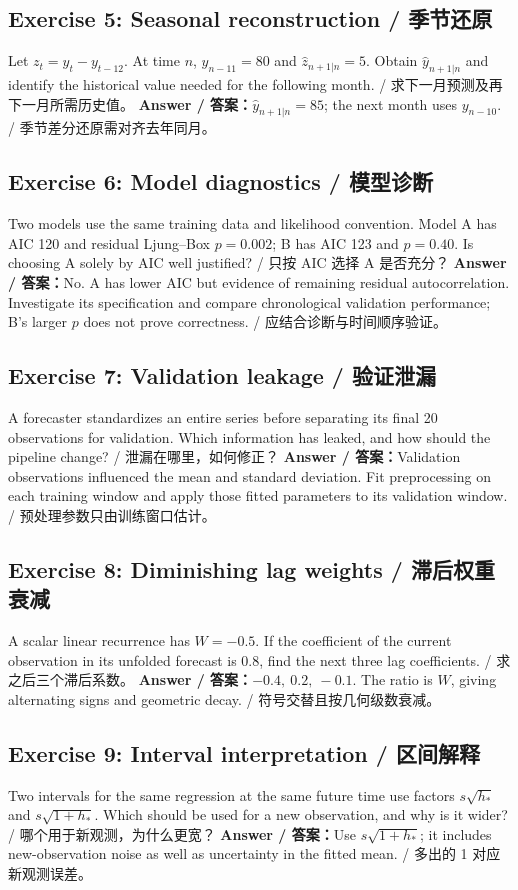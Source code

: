\documentclass[UTF8,fontset=fandol,10.5pt,a4paper]{ctexart}
\begin{document}
\subsection*{Exercise 5: Seasonal reconstruction / 季节还原}
Let $z_t=y_t-y_{t-12}$. At time $n$, $y_{n-11}=80$ and $\hat z_{n+1|n}=5$. Obtain $\hat y_{n+1|n}$ and identify the historical value needed for the following month. / 求下一月预测及再下一月所需历史值。
\textbf{Answer / 答案：}$\hat y_{n+1|n}=85$; the next month uses $y_{n-10}$. / 季节差分还原需对齐去年同月。
\subsection*{Exercise 6: Model diagnostics / 模型诊断}
Two models use the same training data and likelihood convention. Model A has AIC 120 and residual Ljung--Box $p=0.002$; B has AIC 123 and $p=0.40$. Is choosing A solely by AIC well justified? / 只按 AIC 选择 A 是否充分？
\textbf{Answer / 答案：}No. A has lower AIC but evidence of remaining residual autocorrelation. Investigate its specification and compare chronological validation performance; B's larger $p$ does not prove correctness. / 应结合诊断与时间顺序验证。
\subsection*{Exercise 7: Validation leakage / 验证泄漏}
A forecaster standardizes an entire series before separating its final 20 observations for validation. Which information has leaked, and how should the pipeline change? / 泄漏在哪里，如何修正？
\textbf{Answer / 答案：}Validation observations influenced the mean and standard deviation. Fit preprocessing on each training window and apply those fitted parameters to its validation window. / 预处理参数只由训练窗口估计。
\subsection*{Exercise 8: Diminishing lag weights / 滞后权重衰减}
A scalar linear recurrence has $W=-0.5$. If the coefficient of the current observation in its unfolded forecast is $0.8$, find the next three lag coefficients. / 求之后三个滞后系数。
\textbf{Answer / 答案：}$-0.4,\ 0.2,\ -0.1$. The ratio is $W$, giving alternating signs and geometric decay. / 符号交替且按几何级数衰减。
\subsection*{Exercise 9: Interval interpretation / 区间解释}
Two intervals for the same regression at the same future time use factors $s\sqrt{h_*}$ and $s\sqrt{1+h_*}$. Which should be used for a new observation, and why is it wider? / 哪个用于新观测，为什么更宽？
\textbf{Answer / 答案：}Use $s\sqrt{1+h_*}$; it includes new-observation noise as well as uncertainty in the fitted mean. / 多出的 1 对应新观测误差。
\end{document}
